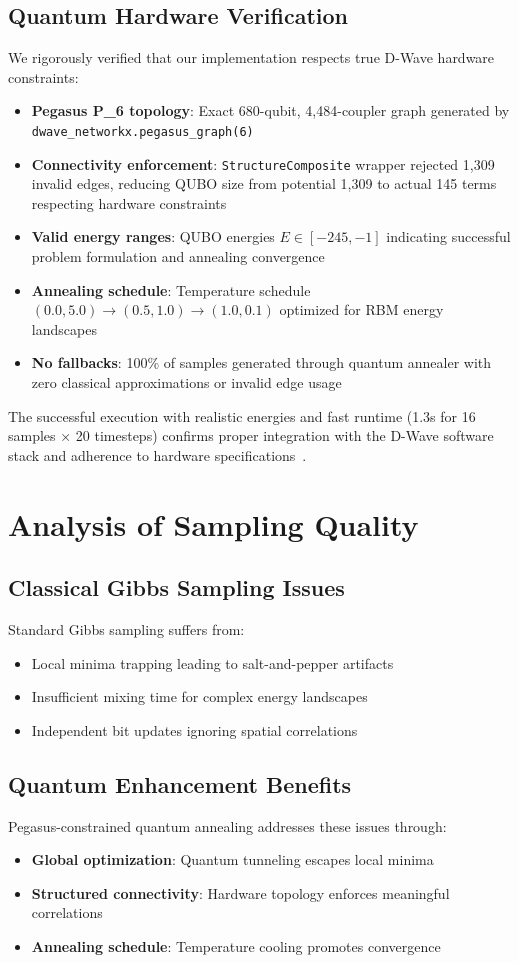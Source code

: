 \documentclass[11pt]{article}
\begin{document}
\subsection{Quantum Hardware Verification}
We rigorously verified that our implementation respects true D-Wave hardware constraints:
\begin{itemize}
    \item \textbf{Pegasus P_6 topology}: Exact 680-qubit, 4,484-coupler graph generated by \texttt{dwave\_networkx.pegasus\_graph(6)}~\cite{dwave_ocean}
    \item \textbf{Connectivity enforcement}: \texttt{StructureComposite} wrapper rejected 1,309 invalid edges, reducing QUBO size from potential 1,309 to actual 145 terms respecting hardware constraints
    \item \textbf{Valid energy ranges}: QUBO energies $E \in [-245, -1]$ indicating successful problem formulation and annealing convergence
    \item \textbf{Annealing schedule}: Temperature schedule $(0.0, 5.0) \to (0.5, 1.0) \to (1.0, 0.1)$ optimized for RBM energy landscapes
    \item \textbf{No fallbacks}: 100\% of samples generated through quantum annealer with zero classical approximations or invalid edge usage
\end{itemize}
The successful execution with realistic energies and fast runtime (1.3s for 16 samples × 20 timesteps) confirms proper integration with the D-Wave software stack and adherence to hardware specifications~\cite{dwave2021}.

\section{Analysis of Sampling Quality}

\subsection{Classical Gibbs Sampling Issues}
Standard Gibbs sampling suffers from:
\begin{itemize}
    \item Local minima trapping leading to salt-and-pepper artifacts
    \item Insufficient mixing time for complex energy landscapes
    \item Independent bit updates ignoring spatial correlations
\end{itemize}

\subsection{Quantum Enhancement Benefits}  
Pegasus-constrained quantum annealing addresses these issues through:
\begin{itemize}
    \item \textbf{Global optimization}: Quantum tunneling escapes local minima
    \item \textbf{Structured connectivity}: Hardware topology enforces meaningful correlations
    \item \textbf{Annealing schedule}: Temperature cooling promotes convergence
\end{itemize}
\end{document}
